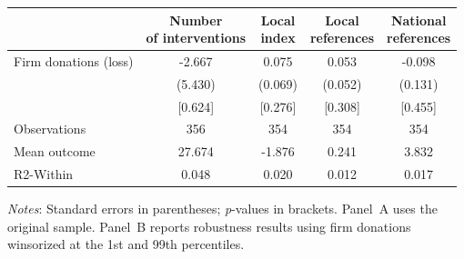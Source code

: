 \documentclass[12pt,a4paper]{article}
\begin{document}
\begin{table}[H]
{
\def\sym#1{\ifmmode^{#1}\else\(^{#1}\)\fi}
\begin{tabular}{lcccc}
\hline\hline
                & \shortstack{Number\\of interventions}
                & \shortstack{Local\\index}
                & \shortstack{Local\\references}
                & \shortstack{National\\references} \\
\hline
Firm donations (loss)
                &   -2.667        &    0.075        &    0.053        &   -0.098        \\
                &   (5.430)       &   (0.069)       &   (0.052)       &   (0.131)       \\
                &   [0.624]       &   [0.276]       &   [0.308]       &   [0.455]       \\
Observations    &     356         &     354         &     354         &     354         \\
Mean outcome    &    27.674       &    -1.876       &     0.241       &     3.832       \\
R2-Within       &     0.048       &     0.020       &     0.012       &     0.017       \\
\hline\hline
\end{tabular}
}

\vspace{1mm}
\begin{flushleft}
\footnotesize
\justifying
\textit{Notes}: Standard errors in parentheses; \textit{p}-values in brackets.  
Panel~A uses the original sample.  
Panel~B reports robustness results using firm donations winsorized at the 1st and 99th percentiles.
\end{flushleft}

\end{table}

\end{document}
